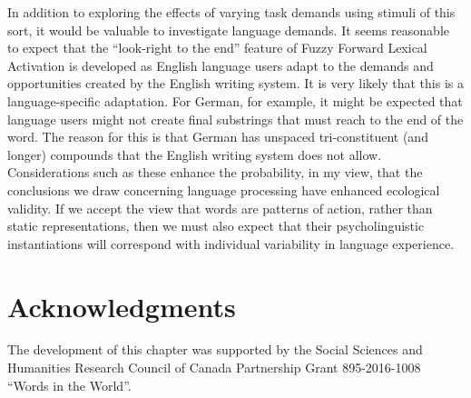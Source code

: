 \documentclass[output=paper]{langsci/langscibook}
\begin{document}
In addition to exploring the effects of varying task demands using stimuli of this sort, it would be valuable to investigate language demands.  It seems reasonable to expect that the “look-right to the end” feature of Fuzzy Forward Lexical Activation is developed as English language users adapt to the demands and opportunities created by the English writing system. It is very likely that this is a language-specific adaptation. For German, for example, it might be expected that language users might not create final substrings that must reach to the end of the word. The reason for this is that German has unspaced tri-constituent (and longer) compounds that the English writing system does not allow. Considerations such as these enhance the probability, in my view, that the conclusions we draw concerning language processing have enhanced ecological validity.  If we accept the view that words are patterns of action, rather than static representations, then we must also expect that their psycholinguistic instantiations will correspond with individual variability in language experience.

\section*{Acknowledgments}
The development of this chapter was supported by the Social Sciences and Humanities Research Council of Canada Partnership Grant 895-2016-1008 ``Words in the World''.

{\sloppy\printbibliography[heading=subbibliography,notkeyword=this]}
\end{document}
